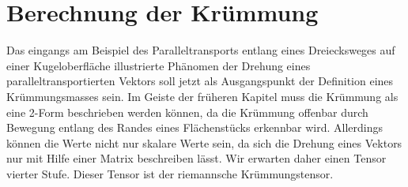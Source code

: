 %
%
\section{Berechnung der Krümmung
\label{buch:kruemmung:section:riemann}}
Das eingangs am Beispiel des Paralleltransports entlang eines
Dreiecksweges auf einer Kugeloberfläche illustrierte Phänomen
der Drehung eines paralleltransportierten Vektors soll jetzt
als Ausgangspunkt der Definition eines Krümmungsmasses sein.
Im Geiste der früheren Kapitel muss die Krümmung als eine 2-Form
beschrieben werden können, da die Krümmung offenbar durch Bewegung
entlang des Randes eines Flächenstücks erkennbar wird.
Allerdings können die Werte nicht nur skalare Werte sein, da
sich die Drehung eines Vektors nur mit Hilfe einer Matrix
beschreiben lässt.
Wir erwarten daher einen Tensor vierter Stufe.
Dieser Tensor ist der riemannsche Krümmungstensor.

%
%
